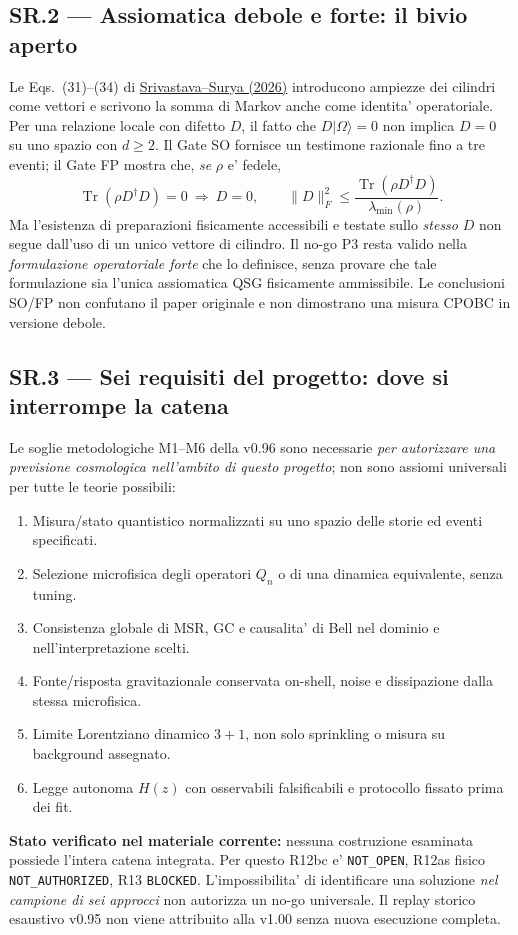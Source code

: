 \documentclass[11pt,a4paper]{article}
\begin{document}
\subsection*{SR.2 --- Assiomatica debole e forte: il bivio aperto}
Le Eqs.~(31)--(34) di \href{https://doi.org/10.1103/thx5-dknv}{Srivastava--Surya (2026)} introducono ampiezze dei cilindri come vettori e scrivono la somma di Markov anche come identita' operatoriale. Per una relazione locale con difetto $D$, il fatto che $D|\Omega\rangle=0$ non implica $D=0$ su uno spazio con $d\ge2$. Il Gate SO fornisce un testimone razionale fino a tre eventi; il Gate FP mostra che, \emph{se} $\rho$ e' fedele,
\begin{equation}
\operatorname{Tr}(\rho D^\dagger D)=0\ \Longrightarrow\ D=0,
\qquad
\|D\|_F^2\le\frac{\operatorname{Tr}(\rho D^\dagger D)}{\lambda_{\min}(\rho)}.
\tag{SR.1}
\end{equation}
Ma l'esistenza di preparazioni fisicamente accessibili e testate sullo \emph{stesso} $D$ non segue dall'uso di un unico vettore di cilindro. Il no-go P3 resta valido nella \emph{formulazione operatoriale forte} che lo definisce, senza provare che tale formulazione sia l'unica assiomatica QSG fisicamente ammissibile. Le conclusioni SO/FP non confutano il paper originale e non dimostrano una misura CPOBC in versione debole.

\clearpage
\subsection*{SR.3 --- Sei requisiti del progetto: dove si interrompe la catena}
Le soglie metodologiche M1--M6 della v0.96 sono necessarie \emph{per autorizzare una previsione cosmologica nell'ambito di questo progetto}; non sono assiomi universali per tutte le teorie possibili:
\begin{enumerate}[label=\textbf{M\arabic*.},leftmargin=2.0cm]
\item Misura/stato quantistico normalizzati su uno spazio delle storie ed eventi specificati.
\item Selezione microfisica degli operatori $Q_n$ o di una dinamica equivalente, senza tuning.
\item Consistenza globale di MSR, GC e causalita' di Bell nel dominio e nell'interpretazione scelti.
\item Fonte/risposta gravitazionale conservata on-shell, noise e dissipazione dalla stessa microfisica.
\item Limite Lorentziano dinamico $3+1$, non solo sprinkling o misura su background assegnato.
\item Legge autonoma $H(z)$ con osservabili falsificabili e protocollo fissato prima dei fit.
\end{enumerate}
\textbf{Stato verificato nel materiale corrente:} nessuna costruzione esaminata possiede l'intera catena integrata. Per questo R12bc e' \texttt{NOT\_OPEN}, R12as fisico \texttt{NOT\_AUTHORIZED}, R13 \texttt{BLOCKED}. L'impossibilita' di identificare una soluzione \emph{nel campione di sei approcci} non autorizza un no-go universale. Il replay storico esaustivo v0.95 non viene attribuito alla v1.00 senza nuova esecuzione completa.
\end{document}
